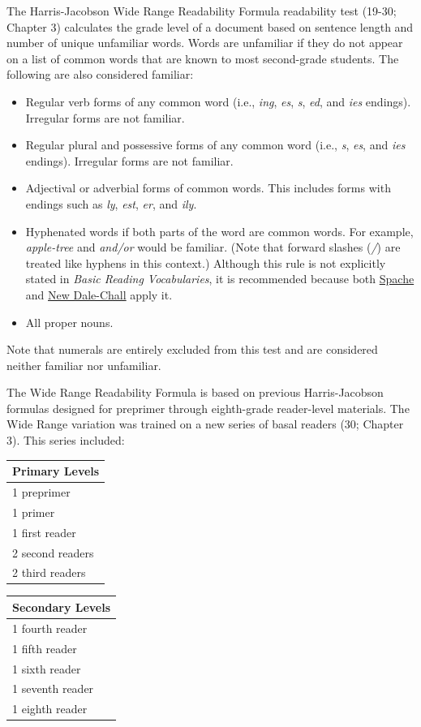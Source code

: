 \documentclass[
]{book}
\providecommand{\tightlist}{%
  \setlength{\itemsep}{0pt}\setlength{\parskip}{0pt}}
\theoremstyle{definition}
\theoremstyle{definition}
\theoremstyle{definition}
\theoremstyle{definition}
\theoremstyle{remark}
\begin{document}
The Harris-Jacobson Wide Range Readability Formula readability test (19-30; Chapter 3) calculates the grade level of a document based on sentence length and number of unique unfamiliar words. Words are unfamiliar if they do not appear on a list of common words that are known to most second-grade students. The following are also considered familiar:

\begin{itemize}
\tightlist
\item
  Regular verb forms of any common word (i.e., \emph{ing}, \emph{es}, \emph{s}, \emph{ed}, and \emph{ies} endings). Irregular forms are not familiar.
\item
  Regular plural and possessive forms of any common word (i.e., \emph{s}, \emph{es}, and \emph{ies} endings). Irregular forms are not familiar.
\item
  Adjectival or adverbial forms of common words. This includes forms with endings such as \emph{ly}, \emph{est}, \emph{er}, and \emph{ily}.
\item
  Hyphenated words if both parts of the word are common words. For example, \emph{apple-tree} and \emph{and/or} would be familiar. (Note that forward slashes (\emph{/}) are treated like hyphens in this context.) Although this rule is not explicitly stated in \emph{Basic Reading Vocabularies}, it is recommended because both \protect\hyperlink{spache-test}{Spache} and \protect\hyperlink{dale-chall-test}{New Dale-Chall} apply it.
\item
  All proper nouns.
\end{itemize}

Note that numerals are entirely excluded from this test and are considered neither familiar nor unfamiliar.

The Wide Range Readability Formula is based on previous Harris-Jacobson formulas designed for preprimer through eighth-grade reader-level materials. The Wide Range variation was trained on a new series of basal readers (30; Chapter 3). This series included:

\begin{table}

\centering
\begin{tabular}[t]{l}
\toprule
Primary Levels\\
\midrule
1 preprimer\\
1 primer\\
1 first reader\\
2 second readers\\
2 third readers\\
\bottomrule
\end{tabular}
\centering
\begin{tabular}[t]{l}
\toprule
Secondary Levels\\
\midrule
1 fourth reader\\
1 fifth reader\\
1 sixth reader\\
1 seventh reader\\
1 eighth reader\\
\bottomrule
\end{tabular}
\end{table}
\end{document}
